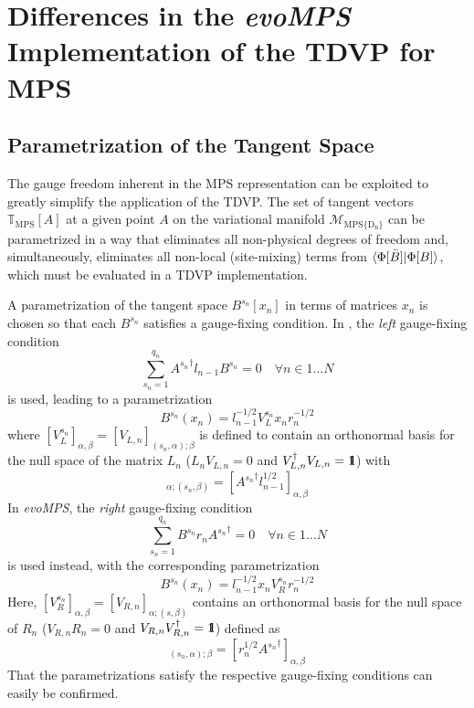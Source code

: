 \documentclass[a4paper,11pt]{article}
\newcommand{\id}{\mbox{$1 \hspace{-1.0mm} {\bf l}$}}
\begin{document}
\section{Differences in the \emph{evoMPS} Implementation of the TDVP for MPS}

\subsection{Parametrization of the Tangent Space}
The gauge freedom inherent in the MPS representation can be exploited to
greatly simplify the application of the TDVP. 
The set of tangent vectors 
$\mathbb{T}_\mathrm{MPS}[A]$ at a given point $A$ on the variational manifold
$\mathcal{M}_\mathrm{MPS\{D_n\}}$ can be parametrized 
in a way that eliminates all non-physical degrees of freedom and, simultaneously,
eliminates all non-local (site-mixing) terms from $\braket{\Phi[\bar{B}] | \Phi[B]}$,
which must be evaluated in a TDVP implementation.

A parametrization of the tangent space $B^{s_n}[x_n]$ in terms of
matrices $x_n$
is chosen so that each $B^{s_n}$ satisfies a gauge-fixing condition. 
In \cite{haegeman_time-dependent_2011}, the \emph{left} gauge-fixing condition
\begin{equation}
    \sum_{s_n=1}^{q_n} {A^{s_n}}^\dagger l_{n - 1} B^{s_n} = 0 \quad \forall n \in 1 \dots N
\end{equation}
is used, leading to a parametrization
\begin{equation}
    B^{s_n}(x_n) = l_{n - 1}^{-1/2} V_L^{s_n} x_n r_n^{-1/2}
    \label{eq:B_par_L}
\end{equation}
where $[V_L^{s_n}]_{\alpha,\beta} = [V_{L,n}]_{(s_n, \alpha);\beta}$ is defined to 
contain an orthonormal basis for the null space of the matrix $L_n$ 
($L_n V_{L,n} = 0$ and $V_{L,n}^\dagger V_{L,n} = \id$)
with
\begin{equation}
    [L_n]_{\alpha; (s_n, \beta)} = [{A^{s_n}}^\dagger l_{n-1}^{1/2}]_{\alpha, \beta}
\end{equation}
In \emph{evoMPS}, the \emph{right} gauge-fixing condition
\begin{equation}
    \sum_{s_n=1}^{q_n} {B^{s_n}} r_{n} {A^{s_n}}^\dagger = 0 \quad \forall n \in 1 \dots N
\end{equation}
is used instead, with the corresponding parametrization
\begin{equation}
    B^{s_n}(x_n) = l_{n - 1}^{-1/2} x_n V_R^{s_n} r_n^{-1/2}
    \label{eq:B_par_R}
\end{equation}
Here, $[V_R^{s_n}]_{\alpha,\beta} = [V_{R,n}]_{\alpha;(s, \beta)}$ contains an
orthonormal basis for the null space of $R_n$ ($V_{R,n} R_n = 0$ and 
$V_{R,n} V_{R,n}^\dagger = \id$) defined as
\begin{equation}
    [R_n]_{(s_n, \alpha); \beta} = [r_{n}^{1/2} {A^{s_n}}^\dagger]_{\alpha, \beta}
\end{equation}
That the parametrizations satisfy the respective gauge-fixing conditions can 
easily be confirmed.
\end{document}
